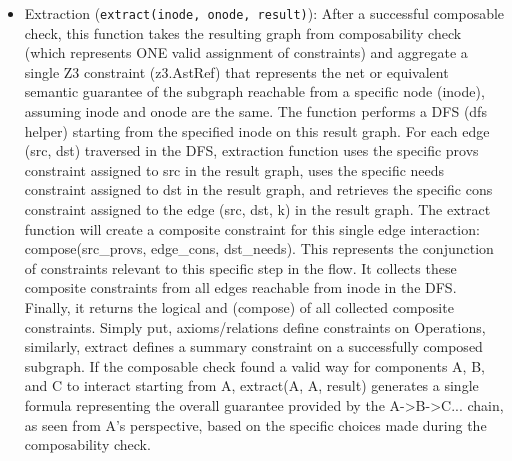 \begin{itemize}
\begin{itemize}
      \item Extraction (\texttt{extract(inode, onode, result)}):
        After a successful composable
        check, this function takes the resulting graph from
        composability check (which
        represents ONE valid assignment of constraints) and aggregate
        a single Z3
        constraint (z3.AstRef) that represents the net or equivalent
        semantic guarantee
        of the subgraph reachable from a specific node (inode),
        assuming inode and onode
        are the same. The function performs a DFS (dfs helper) starting from the
        specified inode on this result graph. For each edge (src,
        dst) traversed in the
        DFS, extraction function uses the specific provs constraint
        assigned to src in
        the result graph, uses the specific needs constraint assigned
        to dst in the
        result graph, and retrieves the specific cons constraint
        assigned to the edge
        (src, dst, k) in the result graph. The extract function will
        create a composite
        constraint for this single edge interaction:
        compose(src\_provs, edge\_cons,
        dst\_needs). This represents the conjunction of constraints
        relevant to this
        specific step in the flow. It collects these composite
        constraints from all
        edges reachable from inode in the DFS. Finally, it returns
        the logical and
        (compose) of all collected composite constraints. Simply put,
        axioms/relations
        define constraints on Operations, similarly, extract defines a summary
        constraint on a successfully composed subgraph. If the
        composable check found a
        valid way for components A, B, and C to interact starting
        from A, extract(A, A,
        result) generates a single formula representing the overall
        guarantee provided
        by the A->B->C... chain, as seen from A's perspective, based
        on the specific
        choices made during the composability check.
    \end{itemize}
\end{itemize}
